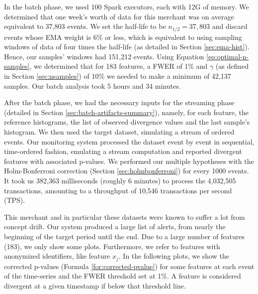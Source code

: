 In the batch phase, we used 100 Spark executors, each with 12G of memory. We determined that one week's worth of data for this merchant was on average equivalent to 37,803 events. We set the half-life to be $n_{1/2}=37,803$ and discard events whose EMA weight is 6\% or less, which is equivalent to using sampling windows of data of four times the half-life (as detailed in Section \ref{sec:ema-hist}). Hence, our samples' windows had 151,212 events. Using Equation \ref{eq:optimal-n-samples}, we determined that for 183 features, a FWER of 1\% and $\gamma$ (as defined in Section \ref{sec:nsamples}) of 10\% we needed to make a minimum of 42,137 samples. Our batch analysis took 5 hours and 34 minutes.

After the batch phase, we had the necessary inputs for the streaming phase (detailed in Section \ref{sec:batch-artifacts-summary}), namely, for each feature, the reference histograms, the list of observed divergence values and the last sample's histogram. We then used the target dataset, simulating a stream of ordered events. Our monitoring system processed the dataset event by event in sequential, time-ordered fashion, emulating a stream computation and reported divergent features with associated p-values. We performed our multiple hypotheses with the Holm-Bonferroni correction (Section \ref{sec:holmbonferroni}) for every 1000 events. It took us 382,363 milliseconds (roughly 6 minutes) to process the 4,032,505 transactions, amounting to a throughput of 10,546 transactions per second (TPS).

This merchant and in particular these datasets were known to suffer a lot from concept drift. Our system produced a large list of alerts, from nearly the beginning of the target period until the end. Due to a large number of features (183), we only show some plots. Furthermore, we refer to features with anonymized identifiers, like feature $x_j$. In the following plots, we show the corrected p-values (Formula \ref{for:corrected-pvalue}) for some features at each event of the time-series and the FWER threshold set at 1\%. A feature is considered divergent at a given timestamp if below that threshold line.

